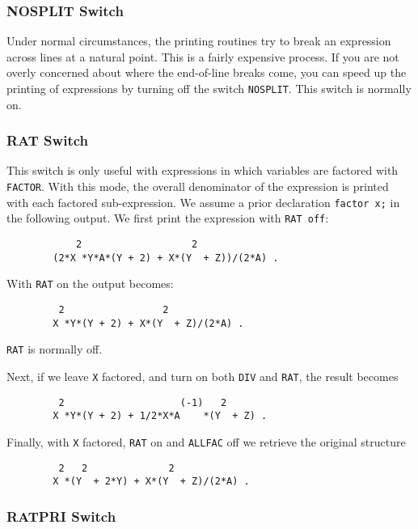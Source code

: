 \subsubsection{NOSPLIT Switch}
\hypertarget{switch:NOSPLIT}{}

Under normal circumstances, the printing routines try to break an expression
across lines at a natural point.  This is a fairly expensive process.  If
you are not overly concerned about where the end-of-line breaks come, you
can speed up the printing of expressions by turning off the switch
{\tt NOSPLIT}.  This switch is normally on.

\subsubsection{RAT Switch}
\hypertarget{switch:RAT}{}

This switch is only useful with expressions in which variables are
factored with {\tt FACTOR}. With this mode, the overall denominator of the
expression is printed with each factored sub-expression. We assume a prior
declaration {\tt factor x;} in the following output. We first print the
expression with {\tt RAT off}:
\begin{verbatim}
            2                   2
        (2*X *Y*A*(Y + 2) + X*(Y  + Z))/(2*A) .
\end{verbatim}
With {\tt RAT} on the output becomes:
\extendedmanual{\newpage}
\begin{verbatim}
         2                 2
        X *Y*(Y + 2) + X*(Y  + Z)/(2*A) .
\end{verbatim}
{\tt RAT} is normally off.

Next, if we leave {\tt X} factored, and turn on both {\tt DIV} and
{\tt RAT}, the result becomes
\begin{verbatim}
         2                    (-1)   2
        X *Y*(Y + 2) + 1/2*X*A    *(Y  + Z) .
\end{verbatim}
Finally, with {\tt X} factored, {\tt RAT} on and {\tt ALLFAC}
off we retrieve the original structure
\begin{verbatim}
         2   2              2
        X *(Y  + 2*Y) + X*(Y  + Z)/(2*A) .
\end{verbatim}

\subsubsection{RATPRI Switch}
\hypertarget{switch:RATPRI}{}

